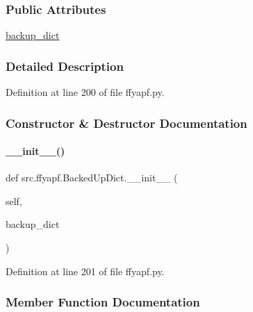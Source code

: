 \subsubsection*{Public Attributes}
\begin{DoxyCompactItemize}
\item 
\hyperlink{classsrc_1_1ffyapf_1_1BackedUpDict_a431ca6a61be2b6eafaed4f6611c2e149}{backup\+\_\+dict}
\end{DoxyCompactItemize}


\subsubsection{Detailed Description}


Definition at line 200 of file ffyapf.\+py.



\subsubsection{Constructor \& Destructor Documentation}
\mbox{\label{classsrc_1_1ffyapf_1_1BackedUpDict_a9fa35c2def371c3c9a209500adb9ef55}} 
\paragraph{\texorpdfstring{\+\_\+\+\_\+init\+\_\+\+\_\+()}{\_\_init\_\_()}}
{\footnotesize\ttfamily def src.\+ffyapf.\+Backed\+Up\+Dict.\+\_\+\+\_\+init\+\_\+\+\_\+ (\begin{DoxyParamCaption}\item[{}]{self,  }\item[{}]{backup\+\_\+dict }\end{DoxyParamCaption})}



Definition at line 201 of file ffyapf.\+py.



\subsubsection{Member Function Documentation}
\mbox{\label{classsrc_1_1ffyapf_1_1BackedUpDict_a95cc9d839346ad8ac80f3f08e696bd41}} 
